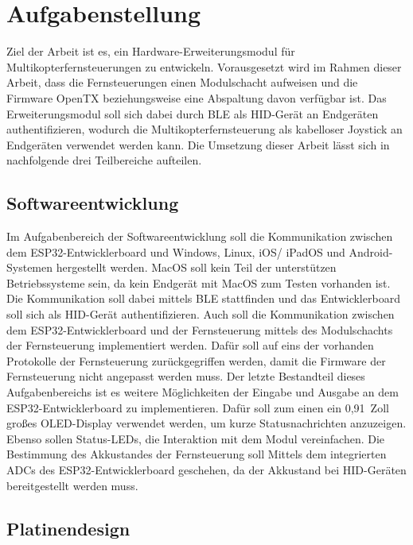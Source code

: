 
\chapter{Aufgabenstellung}

Ziel der Arbeit ist es, ein Hardware-Erweiterungsmodul für Multikopterfernsteuerungen zu entwickeln. Vorausgesetzt wird im Rahmen dieser Arbeit, dass die Fernsteuerungen einen Modulschacht aufweisen und die Firmware OpenTX \cite{opentxMain} beziehungsweise eine Abspaltung davon verfügbar ist. Das Erweiterungsmodul soll sich dabei durch \acs{BLE} als \acs{HID}-Gerät an Endgeräten authentifizieren, wodurch die Multikopterfernsteuerung als kabelloser Joystick an Endgeräten verwendet werden kann. Die Umsetzung dieser Arbeit lässt sich in nachfolgende drei Teilbereiche aufteilen.

\section{Softwareentwicklung}

Im Aufgabenbereich der Softwareentwicklung soll die Kommunikation zwischen dem ESP32-Entwicklerboard und Windows, Linux, iOS/ iPadOS und Android-Systemen hergestellt werden. MacOS soll kein Teil der unterstützen Betriebssysteme sein, da kein Endgerät mit MacOS zum Testen vorhanden ist. Die Kommunikation soll dabei mittels \acs{BLE} stattfinden und das Entwicklerboard soll sich als \acs{HID}-Gerät authentifizieren. Auch soll die Kommunikation zwischen dem ESP32-Entwicklerboard und der Fernsteuerung mittels des Modulschachts der Fernsteuerung implementiert werden. Dafür soll auf eins der vorhanden Protokolle der Fernsteuerung zurückgegriffen werden, damit die Firmware der Fernsteuerung nicht angepasst werden muss. Der letzte Bestandteil dieses Aufgabenbereichs ist es weitere Möglichkeiten der Eingabe und Ausgabe an dem ESP32-Entwicklerboard zu implementieren. Dafür soll zum einen ein 0,91~Zoll großes OLED-Display verwendet werden, um kurze Statusnachrichten anzuzeigen. Ebenso sollen Status-LEDs, die Interaktion mit dem Modul vereinfachen. Die Bestimmung des Akkustandes der Fernsteuerung soll Mittels dem integrierten \acp{ADC} des ESP32-Entwicklerboard geschehen, da der Akkustand bei \acs{HID}-Geräten bereitgestellt werden muss.

\section{Platinendesign}

